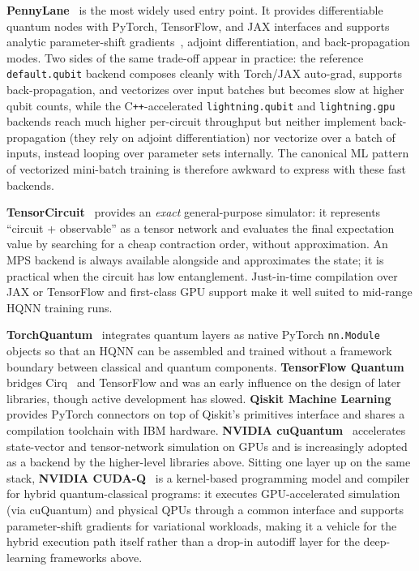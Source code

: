 \documentclass[aps,10pt,groupedaddress,prx,superscriptaddress,twocolumn,balancelastpage, tightenlines]{revtex4-2}
\theoremstyle{plain}  %
\begin{document}
\textbf{PennyLane}~\cite{bergholm_pennylane_2020} is the most widely used entry point. It provides differentiable quantum nodes with PyTorch, TensorFlow, and JAX interfaces and supports analytic parameter-shift gradients~\cite{Mitarai_2018_QClearning, wierichs_general_2022}, adjoint differentiation, and back-propagation modes. Two sides of the same trade-off appear in practice: the reference \texttt{default.qubit} backend composes cleanly with Torch/JAX auto-grad, supports back-propagation, and vectorizes over input batches but becomes slow at higher qubit counts, while the C\texttt{++}-accelerated \texttt{lightning.qubit} and \texttt{lightning.gpu} backends reach much higher per-circuit throughput but neither implement back-propagation (they rely on adjoint differentiation) nor vectorize over a batch of inputs, instead looping over parameter sets internally. The canonical \gls{ML} pattern of vectorized mini-batch training is therefore awkward to express with these fast backends.

\textbf{TensorCircuit}~\cite{zhang_tensorcircuit_2023} provides an \emph{exact} general-purpose simulator: it represents ``circuit + observable'' as a tensor network and evaluates the final expectation value by searching for a cheap contraction order, without approximation. An MPS backend is always available alongside and approximates the state; it is practical when the circuit has low entanglement. Just-in-time compilation over JAX or TensorFlow and first-class GPU support make it well suited to mid-range \gls{HQNN} training runs.

\textbf{TorchQuantum}~\cite{wang_torchquantum_2022} integrates quantum layers as native PyTorch \texttt{nn.Module} objects so that an \gls{HQNN} can be assembled and trained without a framework boundary between classical and quantum components. \textbf{TensorFlow Quantum}~\cite{broughton_tfq_2020} bridges Cirq~\cite{cirq_developers_cirq_2024} and TensorFlow and was an early influence on the design of later libraries, though active development has slowed. \textbf{Qiskit Machine Learning}~\cite{javadi_qiskit_2024} provides PyTorch connectors on top of Qiskit's primitives interface and shares a compilation toolchain with IBM hardware. \textbf{NVIDIA cuQuantum}~\cite{bayraktar_cuquantum_2023} accelerates state-vector and tensor-network simulation on GPUs and is increasingly adopted as a backend by the higher-level libraries above. Sitting one layer up on the same stack, \textbf{NVIDIA CUDA-Q}~\cite{the_cuda-q_development_team_cuda-q_2025} is a kernel-based programming model and compiler for hybrid quantum-classical programs: it executes GPU-accelerated simulation (via cuQuantum) and physical \glspl{QPU} through a common interface and supports parameter-shift gradients for variational workloads, making it a vehicle for the hybrid execution path itself rather than a drop-in autodiff layer for the deep-learning frameworks above.
\end{document}
